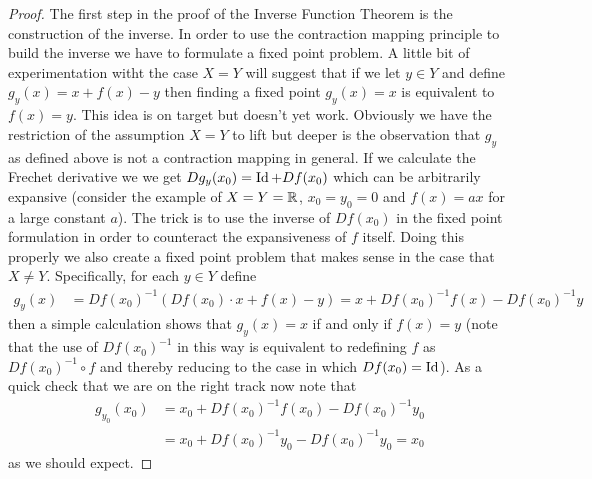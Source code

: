 \begin{proof}
The first step in the proof of the Inverse Function Theorem is the construction of the inverse.  In order to use the contraction mapping principle to build the inverse we have to formulate a fixed point problem.  A little bit of experimentation witht the case $X=Y$ will suggest that if we let $y \in Y$ and define $g_y(x) = x + f(x) - y$ then finding a fixed point $g_y(x) = x$ is equivalent to $f(x) = y$.  This idea is on target but doesn't yet work.  Obviously we have the restriction of the assumption $X=Y$ to lift but deeper is the observation that $g_y$ as defined above is not a contraction mapping in general.  If we calculate the Frechet derivative we
we get $Dg_y(x_0) = \operatorname*{Id} + Df(x_0)$ which can be arbitrarily expansive (consider the example of $X=Y=\mathbb{R}$, $x_0=y_0=0$ and $f(x) = ax$ for a large constant $a$).  The trick is to use the inverse of $Df(x_0)$ in the fixed point formulation in order to counteract the expansiveness of $f$ itself.  Doing this properly we also create a fixed point problem that makes sense in the case that $X \neq Y$.  Specifically, for each $y \in Y$ define
\begin{align*}
g_y(x) &= Df(x_0)^{-1} (Df(x_0) \cdot x + f(x) - y) = x + Df(x_0)^{-1} f (x) -  Df(x_0)^{-1} y
\end{align*}
then a simple calculation shows that $g_y(x) = x$ if and only if $f(x) = y$ (note that the use of $Df(x_0)^{-1}$ in this way is equivalent to redefining $f$ as $Df(x_0)^{-1} \circ f$ and thereby reducing to the case in which $Df(x_0) = \operatorname*{Id}$).  As a quick check that we are on the right track now note that
\begin{align*}
g_{y_0}(x_0) &= x_0 + Df(x_0)^{-1} f (x_0) -  Df(x_0)^{-1} y_0 \\
&= x_0 + Df(x_0)^{-1} y_0 -  Df(x_0)^{-1} y_0 = x_0
\end{align*}
as we should expect.


\end{proof}
